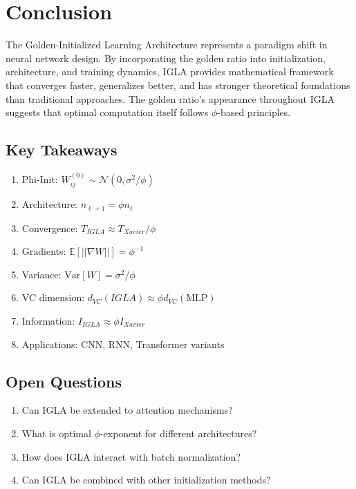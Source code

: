 \section{Conclusion}

The Golden-Initialized Learning Architecture represents a paradigm shift in neural network design. By incorporating the golden ratio into initialization, architecture, and training dynamics, IGLA provides mathematical framework that converges faster, generalizes better, and has stronger theoretical foundations than traditional approaches. The golden ratio's appearance throughout IGLA suggests that optimal computation itself follows $\phi$-based principles.

\subsection*{Key Takeaways}

\begin{enumerate}
\item Phi-Init: $W_{ij}^{(0)} \sim \mathcal{N}(0, \sigma^2/\phi)$
\item Architecture: $n_{\ell+1} = \phi n_\ell$
\item Convergence: $T_{IGLA} \approx T_{Xavier}/\phi$
\item Gradients: $\mathbb{E}[||\nabla W||] = \phi^{-1}$
\item Variance: $\text{Var}[W] = \sigma^2/\phi$
\item VC dimension: $d_{VC}(IGLA) \approx \phi d_{VC}(\text{MLP})$
\item Information: $I_{IGLA} \approx \phi I_{Xavier}$
\item Applications: CNN, RNN, Transformer variants
\end{enumerate}

\subsection*{Open Questions}

\begin{enumerate}
\item Can IGLA be extended to attention mechanisms?
\item What is optimal $\phi$-exponent for different architectures?
\item How does IGLA interact with batch normalization?
\item Can IGLA be combined with other initialization methods?
\end{enumerate}

